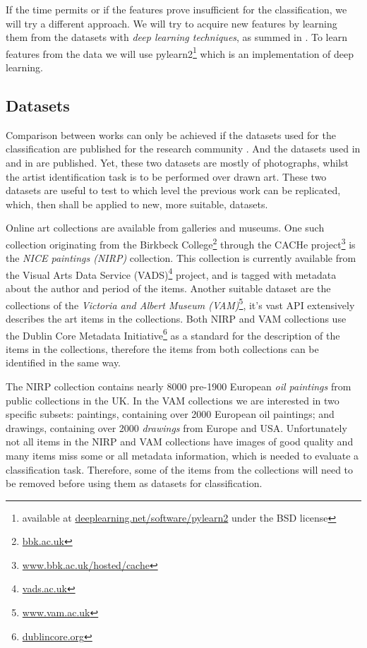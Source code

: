 \documentclass[a4paper,twocolumn]{article}
\begin{document}
If the time permits or if the features prove insufficient for the
classification, we will try a different approach.  We will try to acquire new
features by learning them from the datasets with \emph{deep learning
techniques}, as summed in \cite{antes13deep}.  To learn features from the data
we will use pylearn2\footnote{available at
\href{http://deeplearning.net/software/pylearn2/}
{deeplearning.net/software/pylearn2} under the BSD license} which is an
implementation of deep learning.

\subsection{Datasets}
\label{datasets}

Comparison between works can only be achieved if the datasets used for the
classification are published for the research community \cite{mach10clas}.  And
the datasets used in \cite{mach10clas} and in \cite{jma12clas} are published.
Yet, these two datasets are mostly of photographs, whilst the artist
identification task is to be performed over drawn art.  These two datasets are
useful to test to which level the previous work can be replicated, which, then
shall be applied to new, more suitable, datasets.

Online art collections are available from galleries and museums.  One such
collection originating from the Birkbeck College\footnote{
\href{http://www.bbk.ac.uk}{bbk.ac.uk}} through the CACHe project\footnote{
\href{http://www.bbk.ac.uk/hosted/cache/}{www.bbk.ac.uk/hosted/cache}} is the
\emph{NICE paintings (NIRP)} collection.  This collection is currently
available from the Visual Arts Data Service (VADS)\footnote{
\href{http://vads.ac.uk/}{vads.ac.uk}} project, and is tagged with metadata
about the author and period of the items.  Another suitable dataset are the
collections of the \emph{Victoria and Albert Museum (VAM)}\footnote{
\href{http://www.vam.ac.uk/}{www.vam.ac.uk}}, it's vast API extensively
describes the art items in the collections.  Both NIRP and VAM collections use
the Dublin Core Metadata Initiative\footnote{
\href{http://dublincore.org/}{dublincore.org}} as a standard for the
description of the items in the collections, therefore the items from both
collections can be identified in the same way.

The NIRP collection contains nearly 8000 pre-1900 European \emph{oil paintings}
from public collections in the UK.  In the VAM collections we are interested in
two specific subsets: paintings, containing over 2000 European oil paintings;
and drawings, containing over 2000 \emph{drawings} from Europe and USA.
Unfortunately not all items in the NIRP and VAM collections have images of good
quality and many items miss some or all metadata information, which is needed
to evaluate a classification task.  Therefore, some of the items from the
collections will need to be removed before using them as datasets for
classification.
\end{document}
